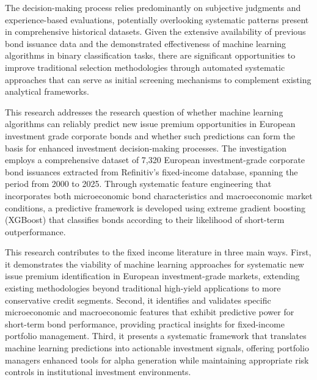 The decision-making process relies predominantly on subjective judgments and experience-based evaluations, potentially overlooking systematic patterns present in comprehensive historical datasets. Given the extensive availability of previous bond issuance data and the demonstrated effectiveness of machine learning algorithms in binary classification tasks, there are significant opportunities to improve traditional selection methodologies through automated systematic approaches that can serve as initial screening mechanisms to complement existing analytical frameworks.

This research addresses the research question of whether machine learning algorithms can reliably predict new issue premium opportunities in European investment grade corporate bonds and whether such predictions can form the basis for enhanced investment decision-making processes. The investigation employs a comprehensive dataset of 7,320 European investment-grade corporate bond issuances extracted from Refinitiv's fixed-income database, spanning the period from 2000 to 2025. Through systematic feature engineering that incorporates both microeconomic bond characteristics and macroeconomic market conditions, a predictive framework is developed using extreme gradient boosting (XGBoost) that classifies bonds according to their likelihood of short-term outperformance.

This research contributes to the fixed income literature in three main ways. First, it demonstrates the viability of machine learning approaches for systematic new issue premium identification in European investment-grade markets, extending existing methodologies beyond traditional high-yield applications to more conservative credit segments. Second, it identifies and validates specific microeconomic and macroeconomic features that exhibit predictive power for short-term bond performance, providing practical insights for fixed-income portfolio management. Third, it presents a systematic framework that translates machine learning predictions into actionable investment signals, offering portfolio managers enhanced tools for alpha generation while maintaining appropriate risk controls in institutional investment environments.